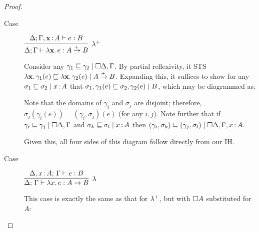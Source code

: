 \documentclass{article}
\begin{document}
\begin{proof}
\begin{description}

    \TODO


    \vspace{1em}
  \item[Case] $\infer[\fn^+]{\GD;\GG \ent \fn\bind{\m{x}} e : A \mto B}{
    \GD; \GG{},\m{x}\of A \ent e : B}$


    Consider any $\lr{\cxdisc{\GD},\GG}{\gamma_1 \ale \gamma_2}$. By partial
    reflexivity, it STS $\lr{A \mto B}{\fn\bind{\m{x}} \gamma_1(e) \ale
      \fn\bind{\m{x}} \gamma_2(e)}$. Expanding this, it suffices to show for any
    $\lr{x \of A}{\sigma_1 \ale \sigma_2}$ that
    $\commsq{B}{\sigma_1}{\sigma_2}{\gamma_1(e)}{\gamma_2(e)}$, which may be
    diagrammed as:
    \begin{center}
              {}
    \end{center}

    Note that the domains of $\gamma_i$ and $\sigma_j$ are disjoint; therefore,
    $\sigma_j(\gamma_i(e)) = (\gamma_i,\sigma_j)(e)$ (for any $i,j$). Note
    further that if $\lr{\cxdisc{\GD},\GG}{\gamma_i \ale \gamma_j}$ and
    $\lr{x\of A}{\sigma_k \ale \sigma_l}$ then $\lr{\cxdisc{\GD},\GG,x\of
      A}{(\gamma_i,\sigma_k) \ale (\gamma_j,\sigma_l)}$.

    Given this, all four sides of this diagram follow directly from our IH.


    \vspace{1em}
  \item[Case] $\infer[\fn]{\J{\GD}{\GG}{\fn\bind{x} e}{A \uto B}}{
    \J{\GD,x\of A}{\GG}{e}{B}}$

    This case is exactly the same as that for $\fn^+$, but with $\disc{A}$
    substituted for $A$:


\end{description}
\end{proof}
\end{document}
